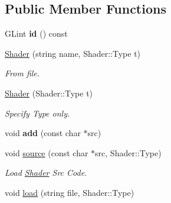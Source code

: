\subsection*{Public Member Functions}
\begin{DoxyCompactItemize}
\item 
\hypertarget{classvsr_1_1_shader_a3dfb66956b186211c1d6afef7cec6bda}{G\-Lint {\bfseries id} () const }\label{classvsr_1_1_shader_a3dfb66956b186211c1d6afef7cec6bda}

\item 
\hypertarget{classvsr_1_1_shader_a4066d8e258dfa15921a9f62a5068f245}{\hyperlink{classvsr_1_1_shader_a4066d8e258dfa15921a9f62a5068f245}{Shader} (string name, Shader\-::\-Type t)}\label{classvsr_1_1_shader_a4066d8e258dfa15921a9f62a5068f245}

\begin{DoxyCompactList}\small\item\em From file. \end{DoxyCompactList}\item 
\hypertarget{classvsr_1_1_shader_acd2105f2d9112a1a70ca421d1799163b}{\hyperlink{classvsr_1_1_shader_acd2105f2d9112a1a70ca421d1799163b}{Shader} (Shader\-::\-Type t)}\label{classvsr_1_1_shader_acd2105f2d9112a1a70ca421d1799163b}

\begin{DoxyCompactList}\small\item\em Specify Type only. \end{DoxyCompactList}\item 
\hypertarget{classvsr_1_1_shader_a154bf9004dc5ffa00e1c78d210a51c30}{void {\bfseries add} (const char $\ast$src)}\label{classvsr_1_1_shader_a154bf9004dc5ffa00e1c78d210a51c30}

\item 
\hypertarget{classvsr_1_1_shader_a1107f5c7fa50610c341c1a39c55bf0fc}{void \hyperlink{classvsr_1_1_shader_a1107f5c7fa50610c341c1a39c55bf0fc}{source} (const char $\ast$src, Shader\-::\-Type)}\label{classvsr_1_1_shader_a1107f5c7fa50610c341c1a39c55bf0fc}

\begin{DoxyCompactList}\small\item\em Load \hyperlink{classvsr_1_1_shader}{Shader} Src Code. \end{DoxyCompactList}\item 
\hypertarget{classvsr_1_1_shader_ac6f7b62037e2a1a3dc12d7fe4d5db2d8}{void \hyperlink{classvsr_1_1_shader_ac6f7b62037e2a1a3dc12d7fe4d5db2d8}{load} (string file, Shader\-::\-Type)}\label{classvsr_1_1_shader_ac6f7b62037e2a1a3dc12d7fe4d5db2d8}


\end{DoxyCompactItemize}

